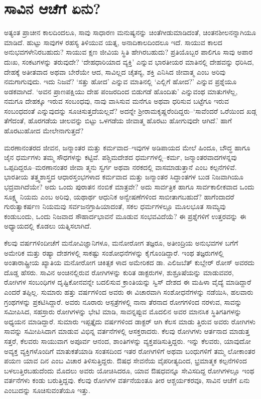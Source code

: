 \section{ಸಾವಿನ ಆಚೆಗೆ ಏನು?}

ಅತ್ಯಂತ ಪ್ರಾಚೀನ ಕಾಲದಿಂದಲೂ, ಸಾವು ಸಾಧಾರಣ ಮನುಷ್ಯನನ್ನು ಚಿಂತೆಗೀಡುಮಾಡಿದಂತೆ, ಚಿಂತನಶೀಲನನ್ನಾಗಿಯೂ ಮಾಡಿದೆ. ಹುಟ್ಟು ಸಾವುಗಳ ರಹಸ್ಯ ತಿಳಿಯುವ ಯತ್ನ, ಅನಾದಿಕಾಲದಿಂದಲೂ ಇದೆ. ಸಾಯುವ ಕಾಲದ ಅನುಭವಗಳೇನಿರಬಹುದು? ಸಾಯುವ ಕ್ಷಣ ಜೀವಿಯ ಸ್ಥಿತಿ ಹೇಗಿರಬಹುದು? ಪ್ರತಿಯೊಬ್ಬರ ಪಾಲಿಗೂ ಸಾವು ಅಪಾರ ದುಃಖ, ಸಂಕಟಗಳನ್ನು ತರುವುದೇ? ‘ದೇಹಧಾರಿಯಾದ ವ್ಯಕ್ತಿ’ ಎನ್ನುವ ಭಾರತೀಯರ ಮಾತಿನಲ್ಲಿ ದೇಹವನ್ನು ಧರಿಸಿದ, ದೇಹಕ್ಕೆ ಅತೀತವಾದ ಅಥವಾ ಬೇರೆಯೇ ಆದ, ಸಾವಿಲ್ಲದ ಚೈತನ್ಯ, ಶಕ್ತಿ ಎನಿಸಿದ ಜೀವಾತ್ಮ ಎಂಬ ಅರಿವು ನಮಗಾಗುವುದು. ಇದು ನಿಜವೆ? ‘ಸತ್ತು ಹೋದ’ ಎನ್ನುವ ಮಾತಿನಲ್ಲಿ ‘ಎಲ್ಲಿಗೆ ಹೋದ?’ ಎನ್ನುವ ಪ್ರಶ್ನೆಯೂ ಅಡಕವಾಗಿದೆ. ‘ಅವನ ಪ್ರಾಣಪಕ್ಷಿಯು ದೇಹ ಪಂಜರದಿಂದ ಬಿಡುಗಡೆ ಹೊಂದಿತು’ ಎನ್ನುವಂಥ ಮಾತುಗಳೆಲ್ಲ, ನಮಗೂ ದೇಹಕ್ಕೂ ಇರುವ ಸಂಬಂಧವು, ನಾವು ವಾಸಿಸುವ ಮನೆಗೂ ಅಥವಾ ಧರಿಸುವ ಬಟ್ಟೆಗೂ ಇರುವ ಸಂಬಂಧದಂತೆ ಎನ್ನುವುದನ್ನು ಸೂಚಿಸುತ್ತದೆಯಲ್ಲವೆ? ಅದನ್ನೇ ಶ‍್ರೀರಾಮಕೃಷ್ಣರೆಂದಿದ್ದರು–‘ಸಾವೆಂದರೆ ಒರೆಯಿಂದ ಖಡ್ಗ ತೆಗೆದಂತೆ, ಹೊರಗಡೆಯ ಚೀಲವನ್ನು ಬಿಟ್ಟು ಒಳಗಡೆಯ ಜೀವಾತ್ಮ ಹೊರಟು ಹೋಗುವುದೇ ಆಗಿದೆ.’ ಹಾಗೆ ಹೊರಟುಹೋದ ಮೇಲೇನಾಗುತ್ತದೆ?

ಮರಣಾನಂತರದ ಜೀವನ, ಜನ್ಮಾಂತರ ಮತ್ತು ಕರ್ಮವಾದ–ಇವುಗಳ ಅಡಿಪಾಯದ ಮೇಲೆ ಹಿಂದೂ, ಬೌದ್ಧ ಹಾಗೂ ಜೈನ ಧರ್ಮಗಳು ತಮ್ಮ ಸೌಧಗಳನ್ನು ಕಟ್ಟಿವೆ. ಪಶ್ಚಿಮದೇಶದ ಧರ್ಮಗಳಲ್ಲಿ–ಕರ್ಮ, ಜನ್ಮಾಂತರವಾದಗಳನ್ನವು ಒಪ್ಪದಿದ್ದರೂ–ಮರಣಾನಂತರ ಜೀವಾ ತ್ಮನು ಸ್ವರ್ಗ ಅಥವಾ ನರಕದಲ್ಲಿ ವಾಸಮಾಡುತ್ತಾನೆ ಎಂಬ ಕಲ್ಪನೆಗಳಿವೆ. ಭಾರತೀಯ ತತ್ತ್ವಶಾಸ್ತ್ರದ ಆಧಾರಸ್ತಂಭಗಳಾದ ಕರ್ಮವಾದ ಮತ್ತು ಜನ್ಮಾಂತರ ಸಿದ್ಧಾಂತಗಳ ಬುಡ ನಿಜವಾಗಿಯೂ ಭದ್ರವಾಗಿದೆಯೇ? ಅದು ಒಂದು ಪುರಾತನ ನಂಬಿಕೆ ಮಾತ್ರವೇ? ಅದು ಸಾರ್ವತ್ರಿಕ ಹಾಗೂ ಸಾರ್ವಕಾಲೀಕವಾದ ಒಂದು ಸೂಕ್ಷ್ಮ ನಿಯಮ ಎಂಬ ಅರಿವು, ಯಥಾರ್ಥ ಆಧುನಿಕ ಅನ್ವೇಷಣೆಗಳಿಂದ ಸಾಬೀತಾಗಬಹುದೆ? ಹಾಗೆಂದಾದರೆ ಗುರುತ್ವಾಕರ್ಷಣ ನಿಯಮವು ಸರ್ವಜನಗ್ರಾಹಿಯಾದಂತೆ, ಸಕಲ ಧರ್ಮಗಳಲ್ಲೂ ಮೂಲಭೂತ ಸಾಮ್ಯವು ಕಂಡುಬಂದು, ಒಂದು ನಿಜವಾದ ಸೌಹಾರ್ದಭಾವನೆ ಮೂಡುವ ಸಂಭವವಿದೆಯೆ? ಈ ಪ್ರಶ್ನೆಗಳಿಗೆ ಉತ್ತರವನ್ನು ಈ ಅಧ್ಯಾಯದಲ್ಲಿ ಕೊಡಲು ಯತ್ನಿಸಲಾಗಿದೆ.

ಕೆಲವು ವರ್ಷಗಳಿಂದೀಚೆಗೆ ಮನೋವಿಜ್ಞಾನಿಗಳೂ, ಮನೋರೋಗ ತಜ್ಞರೂ, ಅತೀಂದ್ರಿಯ ಅನುಭವಗಳ ಬಗೆಗೆ ಅಮೇರಿಕ ಮತ್ತು ರಷ್ಯಾ ದೇಶಗಳಲ್ಲಿ ಸಾಕಷ್ಟು ಸಂಶೋಧನೆಗಳನ್ನು ಕೈಗೊಂಡಿದ್ದಾರೆ. ಇಂಥ ತಜ್ಞರುಗಳಲ್ಲಿ ಅಂತಾರಾಷ್ಟ್ರೀಯ ಖ್ಯಾತಿಯ ಮನೋರೋಗ ಚಿಕಿತ್ಸಕ ಳಾದ ಅಮೇರಿಕದ ಡಾ. ಎಲಿಜಬೆತ್ ಕುಬ್ಲೇರ್ ರೋಸ್ ಅವರದು ದೊಡ್ಡ ಹೆಸರು. ಸಾವಿನ ಅಂಚಿನಲ್ಲಿರುವ ರೋಗಿಗಳನ್ನು ಕುರಿತ ಡಾಕ್ಟರುಗಳ, ಶುಶ್ರೂಷೆಯನ್ನು ಮಾಡುವವರ, ರೋಗಿಗಳ ಸಂಬಂಧಿಗಳ ದೃಷ್ಟಿಕೋನವನ್ನೇ ಬದಲಿಸುವ ಕ್ರಾಂತಿಯನ್ನು ಸ್ವಿಸ್ ದೇಶದ ಈ ಮಹಿಳಾ ವೈದ್ಯೆ ಮಾಡಿದ್ದಾರೆ ಎಂದರೆ ತಪ್ಪಿಲ್ಲ. ಸುಮಾರು ಹತ್ತು ವರ್ಷಗಳಿಂದ ಅವರು ಈ ವಿಚಾರವಾಗಿ ಸಂಶೋಧನೆಗಳನ್ನು ನಡೆಯಿಸಿ, ಹಲವಾರು ಗ್ರಂಥಗಳನ್ನು ಪ್ರಕಟಿಸಿದ್ದಾರೆ. ಅವರು ನೂರಾರು ಆಸ್ಪತ್ರೆಗಳಲ್ಲಿ ನಾನಾ ತೆರನಾದ ರೋಗಗಳಿಂದ ನರಳುವ, ಸಾವನ್ನು ಸಮೀಪಿಸಿದ, ಸಹಸ್ರಾರು ರೋಗಿಗಳನ್ನು ಭೇಟಿ ಮಾಡಿ, ಸಾವನ್ನಪ್ಪುವ ಮೊದಲಿನ ಅವರ ಮಾನಸಿಕ ಸ್ಥಿತಿಗತಿಗಳನ್ನು ಅಧ್ಯಯನ ಮಾಡಿದ್ದಾರೆ. ಸುಮಾರು ಇಪ್ಪತ್ತೈದು ವರ್ಷಗಳಿಂದ ಡಾಕ್ಟರ್ ಆಗಿ ಕೆಲಸ ಮಾಡು ತ್ತಿರುವ ಅವರು ರೋಗಿಗಳು ಸಾವನ್ನು ಸಮೀಪಿಸಿದಾಗ ಮಾಡುವ ವಿಭಿನ್ನ ವರ್ತನೆಗಳಲ್ಲಿ ಆಸಕ್ತರಾದರು. ಕೆಲವು ರೋಗಿಗಳು ಆರ್ತನಾದ ಮಾಡುತ್ತ ಸತ್ತರೆ, ಕೆಲವರು ಸಾಯುವಾಗ ಅಪೂರ್ವ ಆನಂದ, ಶಾಂತಿಗಳನ್ನು ವ್ಯಕ್ತಪಡಿಸುತ್ತಿದ್ದರು. ಇನ್ನು ಕೆಲವರು, ಯಾವುದೋ ಅವ್ಯಕ್ತ ವ್ಯಕ್ತಿಗಳೊಂದಿಗೆ ಮಾತುಕತೆಯಾಡಿ ಸಂತಸದಿಂದ ಇತರ ರೋಗಿಗಳಿಗೆ ಅಥವಾ ಬಂಧುಗಳಿಗೆ ತಮ್ಮ ಲೋಕಾಂತರ ಪಯಣ ಯಾವ ದಿನ ಎಂಬ ವಿಚಾರ ತಿಳಿಸುತ್ತಿದ್ದರು. ಔಷಧ ಸೇವನೆಯ ವೈಪರೀತ್ಯದಿಂದ, ಭ್ರಮಾತ್ಮಕ ಕಲ್ಪನೆಗಳಿಂದ ಬಳಲುತ್ತಿರಬಹುದೆಂದು ಮೊದಲು ಅವರು ಯೋಚಿಸಿದರೂ, ಯಾವ ಔಷಧವನ್ನೂ ಸೇವಿಸದಿದ್ದ ರೋಗಿಗಳಲ್ಲೂ ಇಂಥ ವರ್ತನೆಗಳು ಕಂಡು ಬರುತ್ತಿದ್ದವು. ಕೆಲವು ರೋಗಿಗಳ ವರ್ತನೆಯಂತೂ ತೀರ ಆಶ್ಚರ್ಯಕರವೂ, ಸಾವಿನ ಆಚೆಗೆ ಏನು ಎಂಬುದನ್ನು ಸೂಚಿಸುವಂತೆಯೂ ಇತ್ತು.

